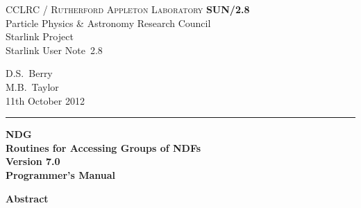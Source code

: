 \documentclass[twoside,11pt]{article}
\newcommand{\stardoccategory}  {Starlink User Note}
\newcommand{\stardocinitials}  {SUN}
\newcommand{\stardocnumber}    {2.8}
\newcommand{\stardocauthors}   {D.S.\ Berry \\ M.B.\ Taylor}
\newcommand{\stardocdate}      {11th October 2012}
\newcommand{\stardoctitle}     {NDG \\ [\latex{1ex}]
                                Routines for Accessing Groups of NDFs}
\newcommand{\stardocversion}   {Version 7.0}
\newcommand{\stardocmanual}    {Programmer's Manual}
\newcommand{\stardocname}{\stardocinitials /\stardocnumber}
\newenvironment{latexonly}{}{}
\newcommand{\latex}[1]{#1}
\renewcommand{\_}{\texttt{\symbol{95}}}
\begin{document}
\thispagestyle{empty}

\begin{latexonly}
   CCLRC / \textsc{Rutherford Appleton Laboratory} \hfill \textbf{\stardocname}\\
   {\large Particle Physics \& Astronomy Research Council}\\
   {\large Starlink Project\\}
   {\large \stardoccategory\ \stardocnumber}
   \begin{flushright}
   \stardocauthors\\
   \stardocdate
   \end{flushright}
   \vspace{-4mm}
   \rule{\textwidth}{0.5mm}
   \vspace{5mm}
   \begin{center}
   {\Huge\textbf{\stardoctitle \\ [2.5ex]}}
   {\LARGE\textbf{\stardocversion \\ [4ex]}}
   {\Huge\textbf{\stardocmanual}}
   \end{center}
   \vspace{5mm}


   \vspace{10mm}
   \begin{center}
      {\Large\textbf{Abstract}}
   \end{center}
\end{latexonly}
\end{document}
